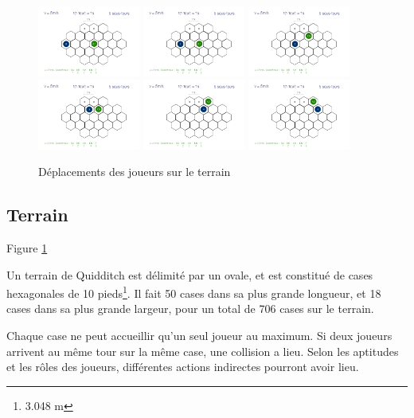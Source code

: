 \begin{figure}[h!]
    \centering
    \includegraphics[width=0.3\textwidth]{../TurnModel/TurnModel0.png}
    \includegraphics[width=0.3\textwidth]{../TurnModel/TurnModel1.png}
    \includegraphics[width=0.3\textwidth]{../TurnModel/TurnModel2.png}
    \\
    \includegraphics[width=0.3\textwidth]{../TurnModel/TurnModel3.png}
    \includegraphics[width=0.3\textwidth]{../TurnModel/TurnModel4.png}
    \includegraphics[width=0.3\textwidth]{../TurnModel/TurnModel5.png}
    \caption{\label{fig:TurnModel} Déplacements des joueurs sur le terrain}
\end{figure}

\subsection{Terrain}
Figure \ref{fig:TurnModel}

Un terrain de Quidditch est délimité par un ovale, et est constitué de cases hexagonales de 10 pieds\footnote{3.048 m}. Il fait 50 cases dans sa plus grande longueur, et 18 cases dans sa plus grande largeur, pour un total de 706 cases sur le terrain.

Chaque case ne peut accueillir qu'un seul joueur au maximum. Si deux joueurs arrivent au même tour sur la même case, une collision a lieu. Selon les \gls{aptitude}s et les rôles des joueurs, différentes actions indirectes pourront avoir lieu.
